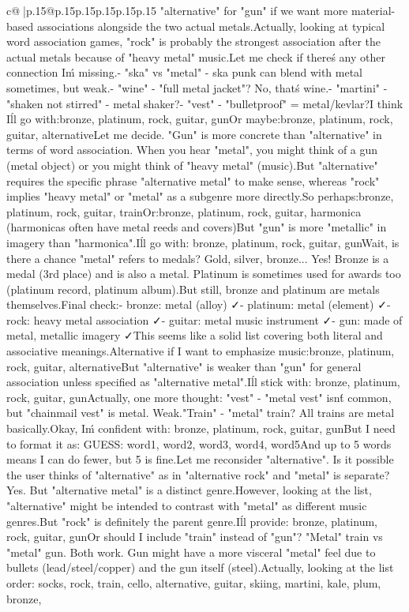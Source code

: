 \documentclass{article}
\begin{document}
{\begin{supertabular}{c@{$\;$}|p{.15\linewidth}@{}p{.15\linewidth}p{.15\linewidth}p{.15\linewidth}p{.15\linewidth}p{.15\linewidth}}
{{{"alternative" for "gun" if we want more material-based associations alongside the two actual metals.\n\n Actually, looking at typical word association games, "rock" is probably the strongest association after the actual metals because of "heavy metal" music.\n\n Let me check if there\'s any other connection I\'m missing.\n - "ska" vs "metal" - ska punk can blend with metal sometimes, but weak.\n - "wine" - "full metal jacket"? No, that\'s wine.\n - "martini" - "shaken not stirred" - metal shaker?\n - "vest" - "bulletproof" = metal/kevlar?\n\n I think I\'ll go with:\n bronze, platinum, rock, guitar, gun\n\n Or maybe:\n bronze, platinum, rock, guitar, alternative\n\n Let me decide. "Gun" is more concrete than "alternative" in terms of word association. When you hear "metal", you might think of a gun (metal object) or you might think of "heavy metal" (music).\n\n But "alternative" requires the specific phrase "alternative metal" to make sense, whereas "rock" implies "heavy metal" or "metal" as a subgenre more directly.\n\n So perhaps:\n bronze, platinum, rock, guitar, train\n\n Or:\n bronze, platinum, rock, guitar, harmonica (harmonicas often have metal reeds and covers)\n\n But "gun" is more "metallic" in imagery than "harmonica".\n\n I\'ll go with: bronze, platinum, rock, guitar, gun\n\n Wait, is there a chance "metal" refers to medals? Gold, silver, bronze... Yes! Bronze is a medal (3rd place) and is also a metal. Platinum is sometimes used for awards too (platinum record, platinum album).\n\n But still, bronze and platinum are metals themselves.\n\n Final check:\n - bronze: metal (alloy) ✓\n - platinum: metal (element) ✓\n - rock: heavy metal association ✓\n - guitar: metal music instrument ✓\n - gun: made of metal, metallic imagery ✓\n\n This seems like a solid list covering both literal and associative meanings.\n\n Alternative if I want to emphasize music:\n bronze, platinum, rock, guitar, alternative\n\n But "alternative" is weaker than "gun" for general association unless specified as "alternative metal".\n\n I\'ll stick with: bronze, platinum, rock, guitar, gun\n\n Actually, one more thought: "vest" - "metal vest" isn\'t common, but "chainmail vest" is metal. Weak.\n\n "Train" - "metal" train? All trains are metal basically.\n\n Okay, I\'m confident with: bronze, platinum, rock, guitar, gun\n\n But I need to format it as: GUESS: word1, word2, word3, word4, word5\n\n And up to 5 words means I can do fewer, but 5 is fine.\n\n Let me reconsider "alternative". Is it possible the user thinks of "alternative" as in "alternative rock" and "metal" is separate? Yes. But "alternative metal" is a distinct genre.\n\n However, looking at the list, "alternative" might be intended to contrast with "metal" as different music genres.\n\n But "rock" is definitely the parent genre.\n\n I\'ll provide: bronze, platinum, rock, guitar, gun\n\n Or should I include "train" instead of "gun"? "Metal" train vs "metal" gun. Both work. Gun might have a more visceral "metal" feel due to bullets (lead/steel/copper) and the gun itself (steel).\n\n Actually, looking at the list order: socks, rock, train, cello, alternative, guitar, skiing, martini, kale, plum, bronze, }}}
\end{supertabular}}
\end{document}
